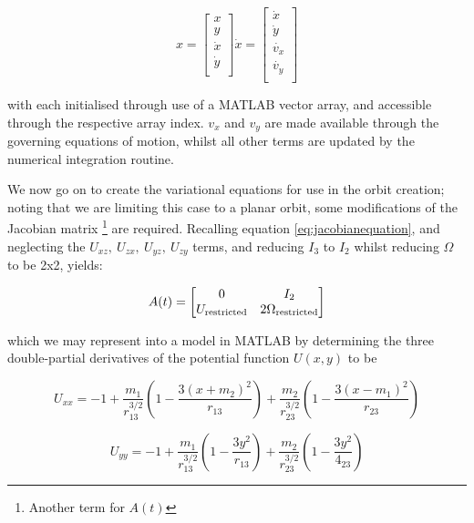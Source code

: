\begin{equation}
	x = 
	\begin{bmatrix}
		x\\
		y\\
		\dot{x}\\
		\dot{y}\\
	\end{bmatrix}
	\dot{x} = 
	\begin{bmatrix}
		\dot{x}\\
		\dot{y}\\
		\dot{v_x}\\
		\dot{v_y}\\
	\end{bmatrix}
\end{equation}

with each initialised through use of a MATLAB vector array, and accessible through the respective array index. $v_x$ and $v_y$ are made available through the governing equations of motion, whilst all other terms are updated by the numerical integration routine.

We now go on to create the variational equations for use in the orbit creation; noting that we are limiting this case to a planar orbit, some modifications of the Jacobian matrix \footnote{Another term for $A(t)$} are required. Recalling equation \ref{eq:jacobianequation}, and neglecting the $U_{xz},~U_{zx},~U_{yz},~U_{zy}$ terms, and reducing $I_3$ to $I_2$ whilst reducing $\Omega$ to be 2x2, yields:

\begin{equation}
	A(t) =
	\begin{bmatrix}
		0 & I_2 \\
		U_{\textnormal{restricted}} & 2\Omega_{\textnormal{restricted}} \\
	\end{bmatrix}
\end{equation}

which we may represent into a model in MATLAB by determining the three double-partial derivatives of the potential function $U(x, y)$ to be 

\begin{equation}
	U_{xx} = -1+\frac{m_1}{r_{13}^{3/2}} \left( 1 - \frac{3(x+m_2)^2}{r_{13}} \right) + \frac{m_2}{r_{23}^{3/2}}\left(1 - \frac{3(x-m_1)^2}{r_{23}}\right)
\end{equation}

\begin{equation}
	U_{yy} = -1 + \frac{m_1}{r_{13}^{3/2}} \left(1-\frac{3y^2}{r_{13}}\right) + \frac{m_2}{r_{23}^{3/2}} \left(1-\frac{3y^2}{4_{23}} \right)
\end{equation}

